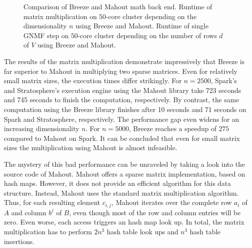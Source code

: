 \begin{figure}
\begin{subfigure}{\dualpgfwidth}
		\caption{}
		\label{subfig:nmfMathBackend}
	\end{subfigure}
	\caption{Comparison of Breeze and Mahout math back end.  Runtime of matrix multiplication on $50$-core cluster depending on the dimensionality $n$ using Breeze and Mahout.  Runtime of single GNMF step on $50$-core cluster depending on the number of rows $d$ of $V$ using Breeze and Mahout.}
	\label{fig:nnmfLoadMathBackend}
\end{figure}

The results of the matrix multiplication demonstrate impressively that Breeze is far superior to Mahout in multiplying two sparse matrices.
Even for relatively small matrix sizes, the execution times differ strikingly.
For $n=2500$, Spark's and Stratosphere's execution engine using the Mahout library take 723 seconds and 745 seconds to finish the computation, respectively.
By contrast, the same computation using the Breeze library finishes after 10 seconds and 71 seconds on Spark and Stratosphere, respectively.
The performance gap even widens for an increasing dimensionality $n$.
For $n=5000$, Breeze reaches a speedup of $275$ compared to Mahout on Spark.
It can be concluded that even for small matrix sizes the multiplication using Mahout is almost infeasible.

The mystery of this bad performance can be unraveled by taking a look into the source code of Mahout.
Mahout offers a sparse matrix implementation, based on hash maps.
However, it does not provide an efficient algorithm for this data structure.
Instead, Mahout uses the standard matrix multiplication algorithm.
Thus, for each resulting element $c_{i,j}$, Mahout iterates over the complete row $a_i$ of $A$ and column $b^{j}$ of $B$, even though most of the row and column entries will be zero.
Even worse, each access triggers an hash map look up.
In total, the matrix multiplication has to perform $2n^3$ hash table look ups and $n^3$ hash table insertions.

